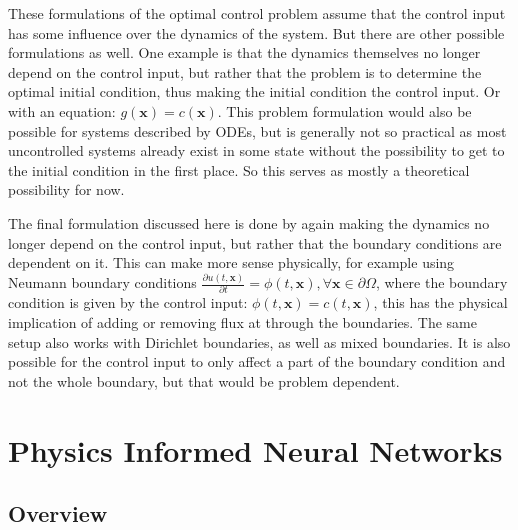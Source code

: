 These formulations of the optimal control problem assume that the control input has some influence over the dynamics of the system. But there are other possible formulations as well. One example is that the dynamics themselves no longer depend on the control input, but rather that the problem is to determine the optimal initial condition, thus making the initial condition the control input. Or with an equation: $g(\bm{x}) = c(\bm{x})$. This problem formulation would also be possible for systems described by ODEs, but is generally not so practical as most uncontrolled systems already exist in some state without the possibility to get to the initial condition in the first place. So this serves as mostly a theoretical possibility for now.

The final formulation discussed here is done by again making the dynamics no longer depend on the control input, but rather that the boundary conditions are dependent on it. This can make more sense physically, for example using Neumann boundary conditions $\frac{\partial u(t, \bm{x})}{\partial t} = \phi(t, \bm{x}), \forall \bm{x} \in \partial \Omega$, where the boundary condition is given by the control input: $\phi(t, \bm{x}) = c(t, \bm{x})$, this has the physical implication of adding or removing flux at through the boundaries. The same setup also works with Dirichlet boundaries, as well as mixed boundaries. It is also possible for the control input to only affect a part of the boundary condition and not the whole boundary, but that would be problem dependent.

\section{Physics Informed Neural Networks}

\subsection{Overview}

